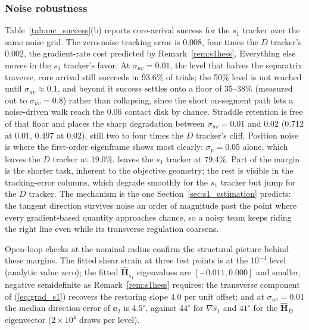 \documentclass[lettersize,journal]{IEEEtran}
\begin{document}
\subsubsection{Noise robustness}
Table~\ref{tab:mc_success}(b) reports core-arrival success for the
$s_1$ tracker over the same noise grid. The zero-noise tracking error
is 0.008, four times the $D$
tracker's 0.002, the gradient-rate cost predicted by
Remark~\ref{rem:s1hess}. Everything else moves in the $s_1$ tracker's
favor. At $\sigma_{uv} = 0.01$, the level that halves the separatrix
traverse, core arrival still succeeds in 93.6\% of trials; the 50\%
level is not reached until $\sigma_{uv} \approx 0.1$, and beyond it
success settles onto a floor of 35--38\% (measured out to $\sigma_{uv}
= 0.8$) rather than collapsing, since the short on-segment path lets a
noise-driven walk reach the 0.06 contact disk by chance. Straddle
retention is free of that floor and places the sharp degradation
between $\sigma_{uv} = 0.01$ and $0.02$ (0.712 at 0.01, 0.497 at
0.02), still two to four times the $D$ tracker's cliff. Position noise is
where the first-order eigenframe shows most clearly: $\sigma_p = 0.05$
alone, which leaves the $D$ tracker at 19.0\%, leaves the $s_1$
tracker at 79.4\%. Part of the margin is the shorter task, inherent to
the objective geometry; the rest is visible in the tracking-error
columns, which degrade smoothly for the $s_1$ tracker but jump for the
$D$ tracker. The
mechanism is the one Section~\ref{sec:s1_estimation} predicts: the
tangent direction survives noise an order of magnitude past the point
where every gradient-based quantity approaches chance, so a noisy team
keeps riding the right line even while its transverse regulation
coarsens.

Open-loop checks at the nominal radius confirm the structural picture
behind these margins. The fitted shear strain at three test points is
at the $10^{-4}$ level (analytic value zero); the fitted
$\hat{\mathbf{H}}_{s_1}$ eigenvalues are $[-0.011, 0.000]$ and smaller,
negative semidefinite as Remark~\ref{rem:s1hess} requires; the
transverse component of (\ref{eq:grad_s1}) recovers the restoring slope
$4.0$ per unit offset; and at $\sigma_{uv} = 0.01$ the median direction
error of $\mathbf{e}_2$ is $4.5^\circ$, against $44^\circ$ for
$\nabla\hat{s}_1$ and $41^\circ$ for the $\hat{\mathbf{H}}_D$
eigenvector ($2\times 10^4$ draws per level).
\end{document}
